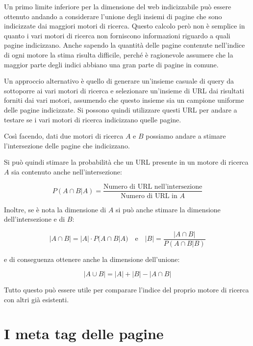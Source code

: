 


Un primo limite inferiore per la dimensione del web indicizzabile può essere ottenuto andando a considerare l'unione degli insiemi di pagine che sono indicizzate dai maggiori motori di ricerca.
Questo calcolo però non è semplice in quanto i vari motori di ricerca non forniscono informazioni riguardo a quali pagine indicizzano. 
Anche sapendo la quantità delle pagine contenute nell'indice di ogni motore la stima risulta difficile, perché è ragionevole assumere che la maggior parte degli indici abbiano una gran parte di pagine in comune.

Un approccio alternativo è quello di generare un'insieme casuale di query da sottoporre ai vari motori di ricerca e selezionare un'insieme di URL dai risultati forniti dai vari motori, assumendo che questo insieme sia un campione uniforme delle pagine indicizzate.
Si possono quindi utilizzare questi URL per andare a testare se i vari motori di ricerca indicizzano quelle pagine.

Così facendo, dati due motori di ricerca $A$ e $B$ possiamo andare a stimare l'intersezione delle pagine che indicizzano.

Si può quindi stimare la probabilità che un URL presente in un motore di ricerca $A$ sia contenuto anche nell'intersezione:

$$
P(A \cap B | A) = \frac{\text{Numero di URL nell'intersezione}}{\text{Numero di URL in }A}
$$

Inoltre, se è nota la dimensione di $A$ si può anche stimare la dimensione dell'intersezione e di $B$:

$$
|A \cap B| = |A| \cdot P(A \cap B | A) \quad \text{e} \quad |B| = \frac{|A \cap B|}{P(A \cap B | B)}
$$

e di conseguenza ottenere anche la dimensione dell'unione:

$$
|A \cup B| = |A| + |B| - |A\cap B|
$$

Tutto questo può essere utile per comparare l'indice del proprio motore di ricerca con altri già esistenti.


\section{I meta tag delle pagine}

